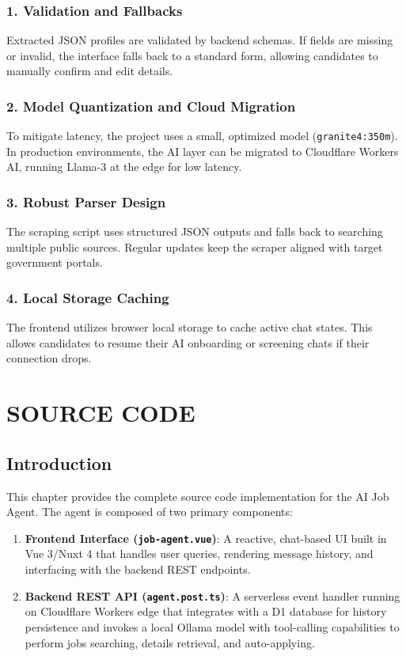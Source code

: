 \documentclass[12pt,a4paper]{report}
\begin{document}
\subsection{1. Validation and Fallbacks}
Extracted JSON profiles are validated by backend schemas. If fields are missing or invalid, the interface falls back to a standard form, allowing candidates to manually confirm and edit details.

\subsection{2. Model Quantization and Cloud Migration}
To mitigate latency, the project uses a small, optimized model (\texttt{granite4:350m}). In production environments, the AI layer can be migrated to Cloudflare Workers AI, running Llama-3 at the edge for low latency.

\subsection{3. Robust Parser Design}
The scraping script uses structured JSON outputs and falls back to searching multiple public sources. Regular updates keep the scraper aligned with target government portals.

\subsection{4. Local Storage Caching}
The frontend utilizes browser local storage to cache active chat states. This allows candidates to resume their AI onboarding or screening chats if their connection drops.


\chapter{SOURCE CODE}

\section{Introduction}
This chapter provides the complete source code implementation for the AI Job Agent. The agent is composed of two primary components:
\begin{enumerate}
    \item \textbf{Frontend Interface (\texttt{job-agent.vue})}: A reactive, chat-based UI built in Vue 3/Nuxt 4 that handles user queries, rendering message history, and interfacing with the backend REST endpoints.
    \item \textbf{Backend REST API (\texttt{agent.post.ts})}: A serverless event handler running on Cloudflare Workers edge that integrates with a D1 database for history persistence and invokes a local Ollama model with tool-calling capabilities to perform jobs searching, details retrieval, and auto-applying.
\end{enumerate}
\end{document}
